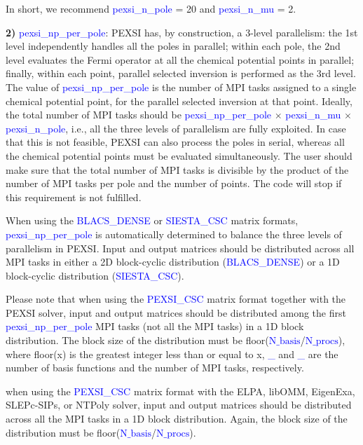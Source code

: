 \documentclass{report}
\begin{document}
In short, we recommend \textcolor{blue}{pexsi\_n\_pole} = 20 and \textcolor{blue}{pexsi\_n\_mu} = 2.

\textbf{2)} \textcolor{blue}{pexsi\_np\_per\_pole}: PEXSI has, by construction, a 3-level parallelism: the 1st level independently handles all the poles in parallel; within each pole, the 2nd level evaluates the Fermi operator at all the chemical potential points in parallel; finally, within each point, parallel selected inversion is performed as the 3rd level. The value of \textcolor{blue}{pexsi\_np\_per\_pole} is the number of MPI tasks assigned to a single chemical potential point, for the parallel selected inversion at that point. Ideally, the total number of MPI tasks should be \textcolor{blue}{pexsi\_np\_per\_pole} $\times$ \textcolor{blue}{pexsi\_n\_mu} $\times$ \textcolor{blue}{pexsi\_n\_pole}, i.e., all the three levels of parallelism are fully exploited. In case that this is not feasible, PEXSI can also process the poles in serial, whereas all the chemical potential points must be evaluated simultaneously. The user should make sure that the total number of MPI tasks is divisible by the product of the number of MPI tasks per pole and the number of points. The code will stop if this requirement is not fulfilled.

When using the \textcolor{blue}{BLACS\_DENSE} or \textcolor{blue}{SIESTA\_CSC} matrix formats, \textcolor{blue}{pexsi\_np\_per\_pole} is automatically determined to balance the three levels of parallelism in PEXSI. Input and output matrices should be distributed across all MPI tasks in either a 2D block-cyclic distribution (\textcolor{blue}{BLACS\_DENSE}) or a 1D block-cyclic distribution (\textcolor{blue}{SIESTA\_CSC}).

Please note that when using the \textcolor{blue}{PEXSI\_CSC} matrix format together with the PEXSI solver, input and output matrices should be distributed among the first \textcolor{blue}{pexsi\_np\_per\_pole} MPI tasks (not all the MPI tasks) in a 1D block distribution. The block size of the distribution must be floor(\textcolor{blue}{$\text{N}\_\text{basis}$}/\textcolor{blue}{$\text{N}\_\text{procs}$}), where floor(x) is the greatest integer less than or equal to x, \textcolor{blue}{\_} and \textcolor{blue}{\_} are the number of basis functions and the number of MPI tasks, respectively.

when using the \textcolor{blue}{PEXSI\_CSC} matrix format with the ELPA, libOMM, EigenExa, SLEPc-SIPs, or NTPoly solver, input and output matrices should be distributed across all the MPI tasks in a 1D block distribution. Again, the block size of the distribution must be floor(\textcolor{blue}{$\text{N}\_\text{basis}$}/\textcolor{blue}{$\text{N}\_\text{procs}$}).
\end{document}

